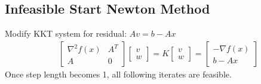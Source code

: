 \documentclass[8pt]{extarticle}
\begin{document}
\begin{multicols*}{2}
  \subsection{Infeasible Start Newton Method}
  Modify KKT system for residual: $Av=b-Ax$
  \begin{align*}
    &\begin{bmatrix}
      \nabla^2 f(x) & A^T \\
      A & 0 
    \end{bmatrix}
          \begin{bmatrix}
            v\\ w
          \end{bmatrix}=
    K
    \begin{bmatrix}
      v\\ w
    \end{bmatrix} =
    \begin{bmatrix}
      -\nabla f(x)\\
      b-Ax
    \end{bmatrix}
  \end{align*}
  Once step length becomes 1, all following iterates are feasible.\\


\end{multicols*}
\end{document}
